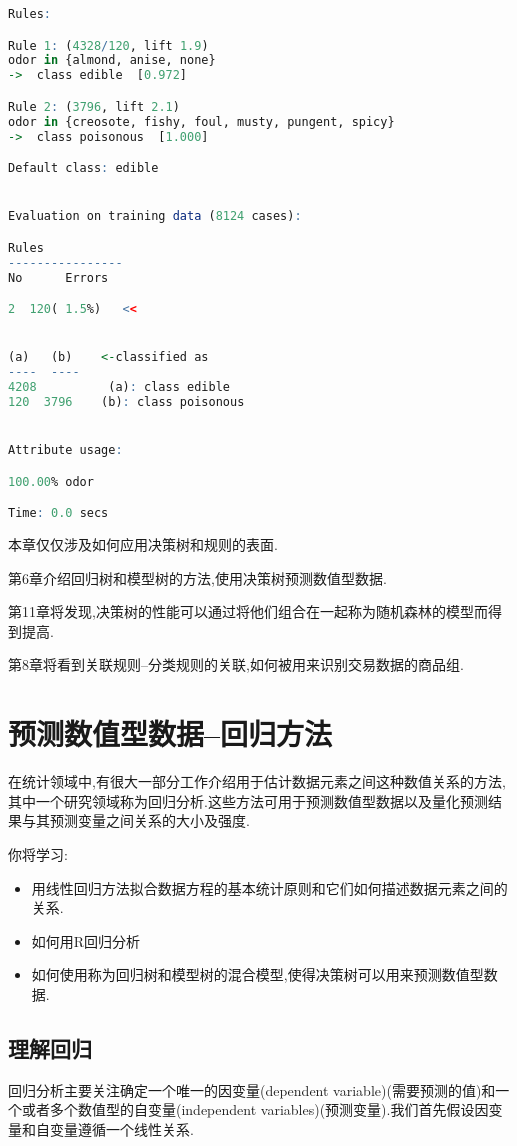 \documentclass[11pt,a4paper,oneside]{book}
\begin{document}
\begin{lstlisting}[language=r]
Rules:

Rule 1: (4328/120, lift 1.9)
odor in {almond, anise, none}
->  class edible  [0.972]

Rule 2: (3796, lift 2.1)
odor in {creosote, fishy, foul, musty, pungent, spicy}
->  class poisonous  [1.000]

Default class: edible


Evaluation on training data (8124 cases):

Rules     
----------------
No      Errors

2  120( 1.5%)   <<


(a)   (b)    <-classified as
----  ----
4208          (a): class edible
120  3796    (b): class poisonous


Attribute usage:

100.00%	odor

Time: 0.0 secs	
\end{lstlisting}

本章仅仅涉及如何应用决策树和规则的表面.

第6章介绍回归树和模型树的方法,使用决策树预测数值型数据.

第11章将发现,决策树的性能可以通过将他们组合在一起称为随机森林的模型而得到提高.

第8章将看到关联规则--分类规则的关联,如何被用来识别交易数据的商品组.

\chapter{预测数值型数据--回归方法}
在统计领域中,有很大一部分工作介绍用于估计数据元素之间这种数值关系的方法,其中一个研究领域称为回归分析.这些方法可用于预测数值型数据以及量化预测结果与其预测变量之间关系的大小及强度.

你将学习:
\begin{itemize}
	\item 用线性回归方法拟合数据方程的基本统计原则和它们如何描述数据元素之间的关系.
	\item 如何用R回归分析
	\item 如何使用称为回归树和模型树的混合模型,使得决策树可以用来预测数值型数据.
\end{itemize}
\section{理解回归}

回归分析主要关注确定一个唯一的因变量(dependent variable)(需要预测的值)和一个或者多个数值型的自变量(independent variables)(预测变量).我们首先假设因变量和自变量遵循一个线性关系.
\end{document}
